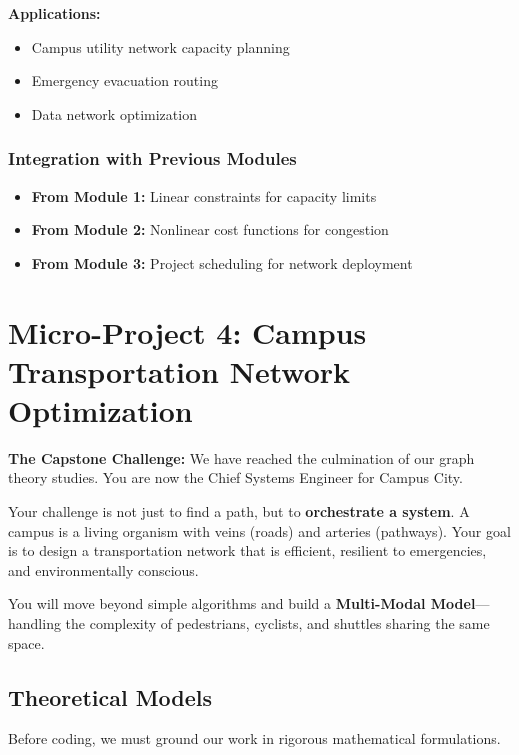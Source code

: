 \documentclass[
  letterpaper,
  DIV=11,
  numbers=noendperiod]{scrreprt}
\providecommand{\tightlist}{%
  \setlength{\itemsep}{0pt}\setlength{\parskip}{0pt}}
\begin{document}
\textbf{Applications:}

\begin{itemize}
\tightlist
\item
  Campus utility network capacity planning
\item
  Emergency evacuation routing
\item
  Data network optimization
\end{itemize}

\subsubsection{Integration with Previous
Modules}\label{integration-with-previous-modules}

\begin{itemize}
\tightlist
\item
  \textbf{From Module 1:} Linear constraints for capacity limits
\item
  \textbf{From Module 2:} Nonlinear cost functions for congestion
\item
  \textbf{From Module 3:} Project scheduling for network deployment
\end{itemize}

\section{Micro-Project 4: Campus Transportation Network
Optimization}\label{micro-project-4-campus-transportation-network-optimization}

\textbf{The Capstone Challenge:} We have reached the culmination of our
graph theory studies. You are now the Chief Systems Engineer for Campus
City.

Your challenge is not just to find a path, but to \textbf{orchestrate a
system}. A campus is a living organism with veins (roads) and arteries
(pathways). Your goal is to design a transportation network that is
efficient, resilient to emergencies, and environmentally conscious.

You will move beyond simple algorithms and build a \textbf{Multi-Modal
Model}---handling the complexity of pedestrians, cyclists, and shuttles
sharing the same space.

\subsection{Theoretical Models}\label{theoretical-models}

Before coding, we must ground our work in rigorous mathematical
formulations.
\end{document}
